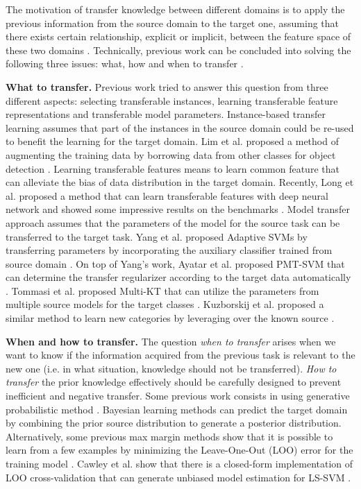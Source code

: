 The motivation of transfer knowledge between different domains is to apply the previous information from the source domain to the target one, assuming that there exists certain relationship, explicit or implicit, between the feature space of these two domains \cite{pan2010survey}. Technically, previous work can be concluded into solving the following three issues: what, how and when to transfer \cite{tommasi2014learning}.


\textbf{What to transfer.} Previous work tried to answer this question from three different aspects: selecting transferable instances, learning transferable feature representations and transferable model parameters. Instance-based transfer learning assumes that part of the instances in the source domain could be re-used to benefit the learning for the target domain. Lim et al. proposed a method of augmenting the training data by borrowing data from other classes for object detection \cite{lim2012transfer}. Learning transferable features means to learn common feature that can alleviate the bias of data distribution in the target domain. Recently, Long et al. proposed a method that can learn transferable features with deep neural network and showed some impressive results on the  benchmarks \cite{LongICML15}. Model transfer
approach assumes that the parameters of the model for the source task can be transferred to the target task. Yang et al. proposed Adaptive SVMs by transferring parameters by incorporating the auxiliary classifier trained from source domain \cite{yang2007cross}. On top of Yang's work, Ayatar et al. proposed PMT-SVM that can determine the transfer regularizer according to the target data automatically \cite{aytar2011tabula}. Tommasi et al. proposed Multi-KT that can utilize the parameters from multiple source models for the target classes  \cite{tommasi2014learning}.
Kuzborskij et al. proposed a similar method to learn new categories by leveraging over the known source \cite{kuzborskij2013n}.

\textbf{When and how to transfer.} The question \textit{when to transfer} arises when we want to know if the information acquired from the previous task is relevant to the new one (i.e. in what situation, knowledge should not be transferred). 
\textit{How to transfer} the prior knowledge effectively should be carefully designed to prevent inefficient and negative transfer. Some previous work consists in using generative probabilistic method \cite{davis2009deep} \cite{wang2014active} \cite{zhou2014multi}.  Bayesian learning methods can predict the target domain by combining the prior source distribution to generate a posterior distribution. Alternatively, some previous max margin methods show that it is possible to learn from a few examples by minimizing the  Leave-One-Out (LOO) error for the training model \cite{kuzborskij2013n} \cite{tommasi2010safety}. Cawley et al. show that there is a closed-form implementation of LOO cross-validation that can generate unbiased model estimation for LS-SVM \cite{cawley2006leave}.

